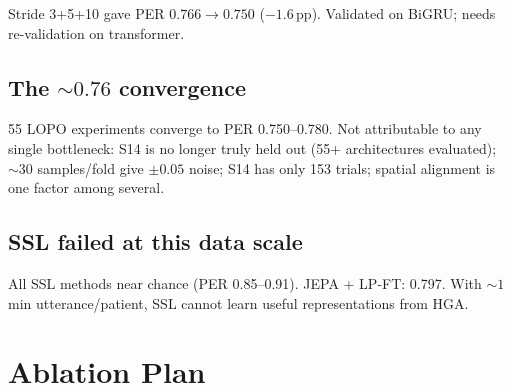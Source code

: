 \documentclass[11pt,letterpaper]{article}
\newcommand{\pp}{\,\text{pp}}
\begin{document}
Stride 3+5+10 gave PER $0.766 \to 0.750$ ($-1.6\pp$). Validated on BiGRU; needs re-validation on transformer.

\subsection{The ${\sim}0.76$ convergence}

55 LOPO experiments converge to PER 0.750--0.780. Not attributable to any single bottleneck: S14 is no longer truly held out (55+ architectures evaluated); ${\sim}30$ samples/fold give $\pm 0.05$ noise; S14 has only 153 trials; spatial alignment is one factor among several.

\subsection{SSL failed at this data scale}

All SSL methods near chance (PER 0.85--0.91). JEPA + LP-FT: 0.797. With ${\sim}1$\,min utterance/patient, SSL cannot learn useful representations from HGA.



\section{Ablation Plan}\label{sec:ablations}
\end{document}
